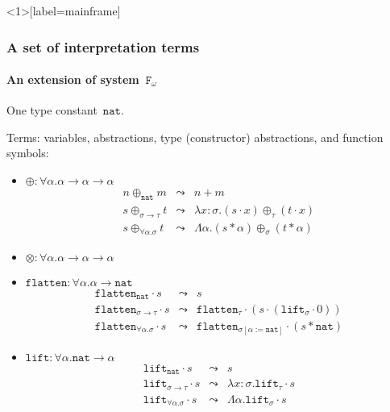 \documentclass[10pt,presentation,color=names]{beamer}
\newcommand{\Fomega}{\mathtt{F}_\omega}
\newcommand{\arrtype}{\rightarrow}
\newcommand{\quant}[2]{\forall #1.#2}
\newcommand{\app}[2]{#1 \cdot #2}
\newcommand{\tapp}[2]{#1 * #2}
\newcommand{\subst}[2]{#1:=#2}
\newcommand{\abs}[2]{\lambda #1.#2}
\newcommand{\tabs}[2]{\Lambda #1.#2}
\newcommand{\arrW}{\leadsto}
\newcommand{\nat}{\mathtt{nat}}
\newcommand{\flatten}{\mathtt{flatten}}
\newcommand{\lift}{\mathtt{lift}}
\begin{document}
\begin{frame}<1>[label=mainframe]
  \frametitle{A set of interpretation terms}
  \framesubtitle{An extension of system~$\Fomega$}
  One type constant~$\nat$.\pause

  \medskip

  Terms: variables, abstractions, type (constructor) abstractions, and
  function symbols\pause:
  \begin{itemize}
  \item $\oplus : \forall \alpha . \alpha \arrtype \alpha \arrtype
    \alpha$\pause
    \[
    \begin{array}{rcl}
      n \oplus_{\nat} m &\arrW& n+m\\
      s \oplus_{\sigma \arrtype \tau} t &\arrW&
      \abs{x:\sigma}{(\app{s}{x}) \oplus_\tau (\app{t}{x})}\\
      s \oplus_{\quant{\alpha}{\sigma}} t &\arrW&
      \tabs{\alpha}{(\tapp{s}{\alpha}) \oplus_\sigma (\tapp{t}{\alpha})}
    \end{array}
    \]\pause
  \item $\otimes : \forall \alpha . \alpha \arrtype \alpha \arrtype
    \alpha$\pause
  \item $\flatten : \forall \alpha . \alpha \arrtype \nat$\pause
    \[
    \begin{array}{rcl}
      \app{\flatten_\nat}{s} &\arrW& s\\
      \app{\flatten_{\sigma \arrtype \tau}}{s} &\arrW& \app{\flatten_\tau}{(\app{s}{(\app{\lift_\sigma}{0})})}\\
      \app{\flatten_{\quant{\alpha}{\sigma}}}{s} &\arrW& \app{\flatten_{\sigma[\subst{\alpha}{\nat}]}}{(\tapp{s}{\nat})}
    \end{array}
    \]\pause
  \item $\lift : \forall \alpha . \nat \arrtype \alpha$\pause
    \[
    \begin{array}{rcl}
      \app{\lift_\nat}{s} &\arrW& s\\
      \app{\lift_{\sigma \arrtype \tau}}{s} &\arrW& \abs{x:\sigma}{\app{\lift_{\tau}}{s}}\\
      \app{\lift_{\quant{\alpha}{\sigma}}}{s} &\arrW& \tabs{\alpha}{\app{\lift_{\sigma}}{s}}
    \end{array}
    \]
  \end{itemize}
\end{frame}
\end{document}
